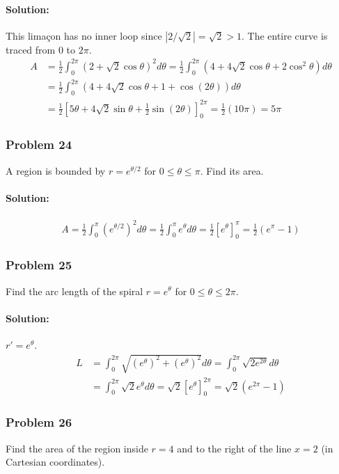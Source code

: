 \documentclass{article}
\begin{document}
\paragraph{Solution:}
This limaçon has no inner loop since $|2/\sqrt{2}| = \sqrt{2} > 1$. The entire curve is traced from $0$ to $2\pi$.
\begin{align*} A &= \frac{1}{2} \int_{0}^{2\pi} (2+\sqrt{2}\cos\theta)^2 d\theta = \frac{1}{2} \int_{0}^{2\pi} (4+4\sqrt{2}\cos\theta+2\cos^2\theta) d\theta \\ &= \frac{1}{2} \int_{0}^{2\pi} (4+4\sqrt{2}\cos\theta + 1+\cos(2\theta)) d\theta \\ &= \frac{1}{2} [5\theta+4\sqrt{2}\sin\theta+\frac{1}{2}\sin(2\theta)]_{0}^{2\pi} = \frac{1}{2}(10\pi) = 5\pi \end{align*}

\subsubsection*{Problem 24}
A region is bounded by $r=e^{\theta/2}$ for $0 \le \theta \le \pi$. Find its area.
\paragraph{Solution:}
\begin{align*} A = \frac{1}{2}\int_0^\pi (e^{\theta/2})^2 d\theta = \frac{1}{2}\int_0^\pi e^\theta d\theta = \frac{1}{2}[e^\theta]_0^\pi = \frac{1}{2}(e^\pi - 1) \end{align*}

\subsubsection*{Problem 25}
Find the arc length of the spiral $r=e^\theta$ for $0 \le \theta \le 2\pi$.
\paragraph{Solution:}
$r' = e^\theta$.
\begin{align*} L &= \int_0^{2\pi} \sqrt{(e^\theta)^2 + (e^\theta)^2} d\theta = \int_0^{2\pi} \sqrt{2e^{2\theta}} d\theta \\ &= \int_0^{2\pi} \sqrt{2}e^\theta d\theta = \sqrt{2}[e^\theta]_0^{2\pi} = \sqrt{2}(e^{2\pi} - 1) \end{align*}

\subsubsection*{Problem 26}
Find the area of the region inside $r=4$ and to the right of the line $x=2$ (in Cartesian coordinates).
\end{document}
